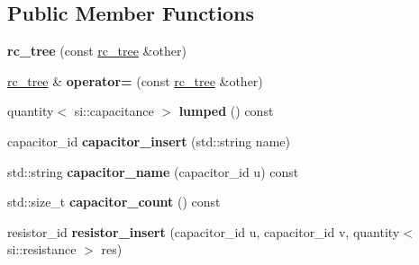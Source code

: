 \subsection*{Public Member Functions}
\begin{DoxyCompactItemize}
\item 
\hypertarget{classophidian_1_1interconnection_1_1rc__tree_a0df0ca1855bfac8e8b762d1421de7017}{{\bfseries rc\-\_\-tree} (const \hyperlink{classophidian_1_1interconnection_1_1rc__tree}{rc\-\_\-tree} \&other)}\label{classophidian_1_1interconnection_1_1rc__tree_a0df0ca1855bfac8e8b762d1421de7017}

\item 
\hypertarget{classophidian_1_1interconnection_1_1rc__tree_aa7c55c652bed438a4aee8f677b23106d}{\hyperlink{classophidian_1_1interconnection_1_1rc__tree}{rc\-\_\-tree} \& {\bfseries operator=} (const \hyperlink{classophidian_1_1interconnection_1_1rc__tree}{rc\-\_\-tree} \&other)}\label{classophidian_1_1interconnection_1_1rc__tree_aa7c55c652bed438a4aee8f677b23106d}

\item 
\hypertarget{classophidian_1_1interconnection_1_1rc__tree_a592637445f8764ca6749d6baf04ca8ba}{quantity$<$ si\-::capacitance $>$ {\bfseries lumped} () const }\label{classophidian_1_1interconnection_1_1rc__tree_a592637445f8764ca6749d6baf04ca8ba}

\item 
\hypertarget{classophidian_1_1interconnection_1_1rc__tree_a800437d718c8a08ddc406aad005fe305}{capacitor\-\_\-id {\bfseries capacitor\-\_\-insert} (std\-::string name)}\label{classophidian_1_1interconnection_1_1rc__tree_a800437d718c8a08ddc406aad005fe305}

\item 
\hypertarget{classophidian_1_1interconnection_1_1rc__tree_a89db718c78d9ab237e3bcc461b10c350}{std\-::string {\bfseries capacitor\-\_\-name} (capacitor\-\_\-id u) const }\label{classophidian_1_1interconnection_1_1rc__tree_a89db718c78d9ab237e3bcc461b10c350}

\item 
\hypertarget{classophidian_1_1interconnection_1_1rc__tree_a29601551ac7d8d622ef12dd72a373dab}{std\-::size\-\_\-t {\bfseries capacitor\-\_\-count} () const }\label{classophidian_1_1interconnection_1_1rc__tree_a29601551ac7d8d622ef12dd72a373dab}

\item 
\hypertarget{classophidian_1_1interconnection_1_1rc__tree_a9d9fa55505a49e5adc7847f485711987}{resistor\-\_\-id {\bfseries resistor\-\_\-insert} (capacitor\-\_\-id u, capacitor\-\_\-id v, quantity$<$ si\-::resistance $>$ res)}\label{classophidian_1_1interconnection_1_1rc__tree_a9d9fa55505a49e5adc7847f485711987}


\end{DoxyCompactItemize}
